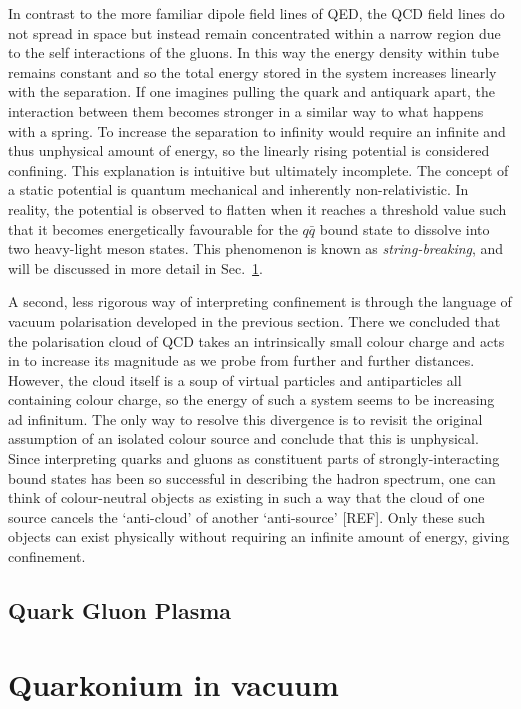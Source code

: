 \documentclass[12pt, a4paper, twoside]{book}
\begin{document}
In contrast to the more familiar dipole field lines of QED, the QCD field lines do not spread in space but instead remain concentrated within a narrow region due to the self interactions of the gluons. In this way the energy density within tube remains constant and so the total energy stored in the system increases linearly with the separation. If one imagines pulling the quark and antiquark apart, the interaction between them becomes stronger in a similar way to what happens with a spring. To increase the separation to infinity would require an infinite and thus unphysical amount of energy, so the linearly rising potential is considered confining. This explanation is intuitive but ultimately incomplete. The concept of a static potential is quantum mechanical and inherently non-relativistic. In reality, the potential is observed to flatten when it reaches a threshold value such that it becomes energetically favourable for the \(q\bar{q}\) bound state to dissolve into two heavy-light meson states. This phenomenon is known as \emph{string-breaking}, and will be discussed in more detail in Sec.~\ref{sec:quark_vac}.

A second, less rigorous way of interpreting confinement is through the language of vacuum polarisation developed in the previous section. There we concluded that the polarisation cloud of QCD takes an intrinsically small colour charge and acts in to increase its magnitude as we probe from further and further distances. However, the cloud itself is a soup of virtual particles and antiparticles all containing colour charge, so the energy of such a system seems to be increasing ad infinitum. The only way to resolve this divergence is to revisit the original assumption of an isolated colour source and conclude that this is unphysical. Since interpreting quarks and gluons as constituent parts of strongly-interacting bound states has been so successful in describing the hadron spectrum, one can think of colour-neutral objects as existing in such a way that the cloud of one source cancels the `anti-cloud' of another `anti-source' [REF]. Only these such objects can exist physically without requiring an infinite amount of energy, giving confinement.
\subsection{Quark Gluon Plasma}
\label{sec:QGP}
\onehalfspacing
\section{Quarkonium in vacuum}
\label{sec:quark_vac}
\onehalfspacing
\end{document}
